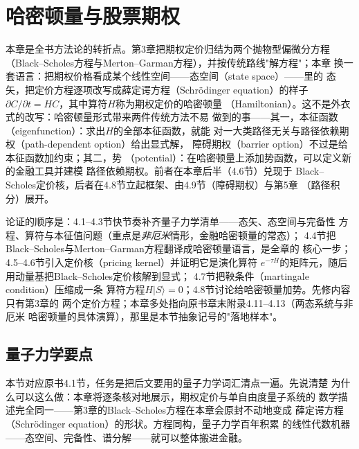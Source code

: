 \chapter{哈密顿量与股票期权}

本章是全书方法论的转折点。第3章把期权定价归结为两个抛物型偏微分方程
（Black--Scholes方程与Merton--Garman方程），并按传统路线"解方程"；本章
换一套语言：把期权价格看成某个线性空间——态空间（state space）——里的
态矢，把定价方程逐项改写成薛定谔方程（Schr\"odinger equation）的样子
$\partial C/\partial t=HC$，其中算符$H$称为期权定价的哈密顿量
（Hamiltonian）。这不是外衣式的改写：哈密顿量形式带来两件传统方法不易
做到的事——其一，本征函数（eigenfunction）：求出$H$的全部本征函数，就能
对一大类路径无关与路径依赖期权（path-dependent option）给出显式解，
障碍期权（barrier option）不过是给本征函数加约束；其二，势
（potential）：在哈密顿量上添加势函数，可以定义新的金融工具并建模
路径依赖期权。前者在本章后半（4.6节）兑现于
Black--Scholes定价核，后者在4.8节立起框架、由4.9节（障碍期权）与第5章
（路径积分）展开。

论证的顺序是：4.1--4.3节快节奏补齐量子力学清单——态矢、态空间与完备性
方程、算符与本征值问题（重点是\emph{非厄米}情形，金融哈密顿量的常态）；
4.4节把Black--Scholes与Merton--Garman方程翻译成哈密顿量语言，是全章的
核心一步；4.5--4.6节引入定价核（pricing kernel）并证明它是演化算符
$e^{-\tau H}$的矩阵元，随后用动量基把Black--Scholes定价核解到显式；
4.7节把鞅条件（martingale condition）压缩成一条
算符方程$H|S\rangle=0$；4.8节讨论给哈密顿量加势。先修内容只有第3章的
两个定价方程；本章多处指向原书章末附录4.11--4.13（两态系统与非厄米
哈密顿量的具体演算），那里是本节抽象记号的"落地样本"。

\section{量子力学要点}

本节对应原书4.1节，任务是把后文要用的量子力学词汇清点一遍。先说清楚
为什么可以这么做：本章将逐条核对地展示，期权定价与单自由度量子系统的
数学描述完全同一——第3章的Black--Scholes方程在本章会原封不动地变成
薛定谔方程（Schr\"odinger equation）的形状。方程同构，量子力学百年积累
的线性代数机器——态空间、完备性、谱分解——就可以整体搬进金融。

